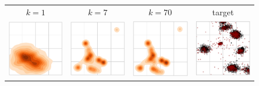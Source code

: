 \begin{figure}
\begin{centering}
\begin{tabular}{ccc|c}
$k=1$ & $k=7$ & $k=70$ & target\tabularnewline
\includegraphics[width=3cm]{figures/toy_save/output_dist_k=1-crop.pdf} & \includegraphics[width=3cm]{figures/toy_save/output_dist_k=20-crop.pdf} & \includegraphics[width=3cm]{figures/toy_save/output_dist_k=70-crop.pdf} &  \includegraphics[width=3cm]{figures/scatter_output_particles_k=70-crop.pdf}\tabularnewline

\end{tabular}
\end{centering}
\end{figure}
